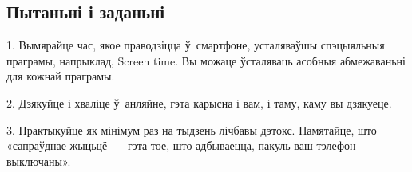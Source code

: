 \subsection*{Пытаньні і заданьні}

1. Вымярайце час, якое праводзіцца ў~смартфоне, усталяваўшы спэцыяльныя праграмы, напрыклад, Screen time. Вы можаце ўсталяваць асобныя абмежаваньні для кожнай праграмы.

2. Дзякуйце і хваліце ў~анляйне, гэта карысна і вам, і таму, каму вы дзякуеце.

3. Практыкуйце як мінімум раз на тыдзень лічбавы дэтокс. Памятайце, што «сапраўднае жыцьцё~--- гэта тое, што адбываецца, пакуль ваш тэлефон выключаны».
